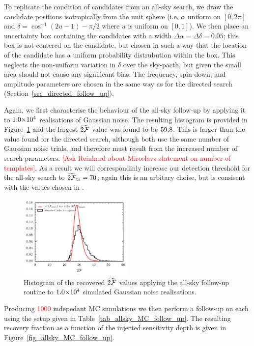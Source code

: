 \documentclass[aps, prd, twocolumn, superscriptaddress, floatfix, showpacs, nofootinbib, longbibliography]{revtex4-1}
\newcommand{\CHECK}[1]{\textcolor{red}{#1}}
\newcommand{\comment}[1]{\textcolor{red}{[#1]}}
\begin{document}
To replicate the condition of candidates from an all-sky search, we draw the
candidate positions isotropically from the unit sphere (i.e. $\alpha$ uniform
on $[0, 2\pi]$ and $\delta = \cos^{-1}(2u{-}1){- }\pi/2$ where $u$ is uniform
on $[0, 1]$). We then place an uncertainty box containing the candidates with a
width $\Delta\alpha=\Delta\delta=0.05$; this box is not centered on the
candidate, but chosen in such a way that the location of the candidate has a
uniform probability distrubution within the box. This neglects the non-uniform
variation in $\delta$ over the sky-pacth, but given the small area should not
cause any significant bias. The frequency, spin-down, and amplitude parameters
are chosen in the same way as for the directed search
(Section~\ref{sec_directed_follow_up}).

Again, we first characterise the behaviour of the all-sky follow-up by applying
it to $1.0{\times}10^{4}$ realisations of Gaussian noise. The resulting histogram
is provided in Figure~\ref{fig_hist_AllSkyMCNoiseOnly} and the largest $\widetilde{2{\mathcal{F}}}$
value was found to be $59.8$. This is larger than the
value found for the directed search, although both use the same number of
Gaussian noise trials, and therefore must result from the increased number of
search parameters. \comment{Ask Reinhard about Miroslavs statement on number of
templates}. As a result we will correspondinly increase our detection threshold
for the all-sky search to $\widetilde{2{\mathcal{F}}}_{\rm tr} = 70$; again this is an arbitary
choise, but is consisent with the values chosen in \citet{shaltev2013}.
\begin{figure}[htb]
\centering
\includegraphics[width=0.5\textwidth]{allsky_noise_twoF_histogram}
\caption{Histogram of the recovered $\widetilde{2{\mathcal{F}}}$ values applying the
all-sky follow-up routine to $1.0{\times}10^{4}$ simulated Gaussian noise
realisations.}
\label{fig_hist_AllSkyMCNoiseOnly}
\end{figure}

Producing \CHECK{1000} indepedant MC simulations we then perform a follow-up on
each using the setup given in Table~\ref{tab_allsky_MC_follow_up}. The
resulting recovery fraction as a function of the injected sensitivity depth is given
in Figure~\ref{fig_allsky_MC_follow_up}.
\end{document}
